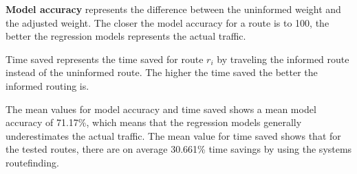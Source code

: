 \textbf{Model accuracy} represents the difference between the uninformed weight and the adjusted weight. The closer the model accuracy for a route is to 100, the better the regression models represents the actual traffic.
 
Time saved represents the time saved for route $r_i$ by traveling the informed route instead of the uninformed route. The higher the time saved the better the informed routing is.

The mean values for model accuracy and time saved shows a mean model accuracy of 71.17\%, which means that the regression models generally underestimates the actual traffic. The mean value for time saved shows that for the tested routes, there are on average 30.661\% time savings by using the systems routefinding.